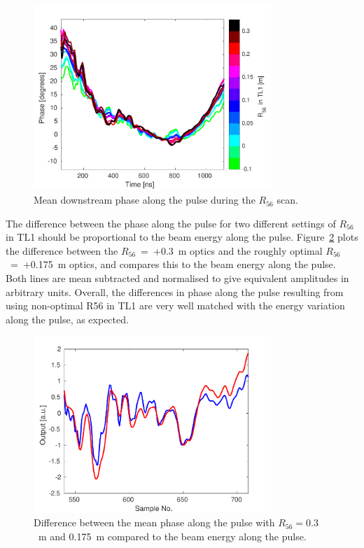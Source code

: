 \begin{figure}
  \centering
  \includegraphics[width=0.8\textwidth]{Figures/propagation/r56Scan_meanPhaseAlong}
  \caption{Mean downstream phase along the pulse during the \(R_{56}\) scan.}
  \label{f:r56Scan_meanPhaseAlong}
\end{figure}

The difference between the phase along the pulse for two different settings of \(R_{56}\) in TL1 should be proportional to the beam energy along the pulse. Figure~\ref{f:r56Scan_comparisonPhaseEnergy} plots the difference between the \(R_{56}\)~=~+0.3~m optics and the roughly optimal \(R_{56}\)~=~+0.175~m optics, and compares this to the beam energy along the pulse. Both lines are mean subtracted and normalised to give equivalent amplitudes in arbitrary units. Overall, the differences in phase along the pulse resulting from using non-optimal R56 in TL1 are very well matched with the energy variation along the pulse, as expected. 

\begin{figure}
  \centering
  \includegraphics[width=0.8\textwidth]{Figures/propagation/r56Scan_comparisonPhaseEnergy}
  \caption{Difference between the mean phase along the pulse with \(R_{56} = 0.3\)~m and 0.175~m compared to the beam energy along the pulse.}
  \label{f:r56Scan_comparisonPhaseEnergy}
\end{figure}

